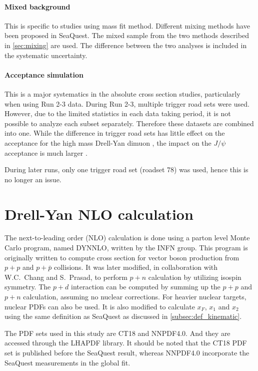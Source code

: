 \documentclass[../main.tex]{subfiles}
\begin{document}
\paragraph{Mixed background}
This is specific to studies using mass fit method. Different mixing methods have been proposed in SeaQuest.
The mixed sample from the two methods described in \cref{sec:mixing} are used. The difference between
the two analyses is included in the systematic uncertainty.

\paragraph{Acceptance simulation}
This is a major systematics in the absolute cross section studies, particularly when using
Run 2-3 data.
During Run 2-3, multiple trigger road sets were used. However, due to the limited statistics in each
data taking period, it is not possible to analyze each subset separately. Therefore these datasets
are combined into one. While the difference in trigger road sets has little effect on the acceptance
for the high mass Drell-Yan dimuon \cite{jdove-8168}, the impact on the $J/\psi$ acceptance is much
larger \cite{chleung-9643}.

During later runs, only one trigger road set (roadset 78) was used, hence this is no
longer an issue.



\section{Drell-Yan NLO calculation}
\label{sec:DYNNLO}
The next-to-leading order (NLO) calculation is done using a parton level Monte
Carlo program, named DYNNLO, written by the INFN group\cite{catani2009,catani2007}. This program
is originally written to compute cross section for vector boson
production from $p+p$ and $p+\bar{p}$ collisions. It was later modified, in
collaboration with W.C.~Chang and S.~Prasad, to perform $p+n$ calculation
by utilizing isospin symmetry. The $p+d$ interaction can be computed by summing up
the $p+p$ and $p+n$ calculation, assuming no nuclear corrections. For heavier nuclear
targets, nuclear PDFs can also be used. It is also modified to calculate $x_F$, $x_1$ and $x_2$
using the same definition as SeaQuest as discussed in \cref{subsec:def_kinematic}.

The PDF sets used in this study are CT18\cite{hou2021} and NNPDF4.0\cite{ball2022a}.
And they are accessed through the LHAPDF library\cite{buckley2015}. It should be noted
that the CT18 PDF set is published before the SeaQuest result, whereas NNPDF4.0
incorporate the SeaQuest measurements\cite{dove2021} in the global fit.
\end{document}
